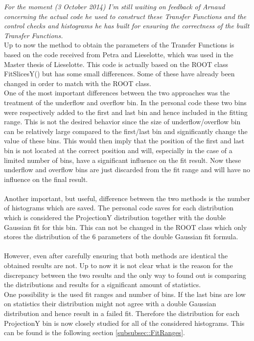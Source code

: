 \textit{For the moment (3 October 2014) I'm still waiting on feedback of Arnaud concerning the actual code he used to construct these Transfer Functions and the control checks and histograms he has built for ensuring the correctness of the built Transfer Functions.}\\
Up to now the method to obtain the parameters of the Transfer Functions is based on the code received from Petra and Lieselotte, which was used in the Master thesis of Lieselotte.
This code is actually based on the ROOT class FitSlicesY() but has some small differences. Some of these have already been changed in order to match with the ROOT class.\\
One of the most important differences between the two approaches was the treatment of the underflow and overflow bin. In the personal code these two bins were respectively added to the first and last bin and hence included in the fitting range. This is not the desired behavior since the size of underflow/overflow bin can be relatively large compared to the first/last bin and significantly change the value of these bins. This would then imply that the position of the first and last bin is not located at the correct position and will, especially in the case of a limited number of bins, have a significant influence on the fit result.
Now these underflow and overflow bins are just discarded from the fit range and will have no influence on the final result.\\
\\
Another important, but useful, difference between the two methods is the number of histograms which are saved. The personal code saves for each distribution which is considered the ProjectionY distribution together with the double Gaussian fit for this bin. This can not be changed in the ROOT class which only stores the distribution of the 6 parameters of the double Gaussian fit formula.\\
\\
However, even after carefully ensuring that both methods are identical the obtained results are not.
Up to now it is not clear what is the reason for the discrepancy between the two results and the only way to found out is comparing the distributions and results for a significant amount of statistics.\\
One possibility is the used fit ranges and number of bins. If the last bins are low on statistics their distribution might not agree with a double Gaussian distribution and hence result in a failed fit. Therefore the distribution for each ProjectionY bin is now closely studied for all of the considered histograms. This can be found is the following section \ref{subsubsec::FitRanges}.

